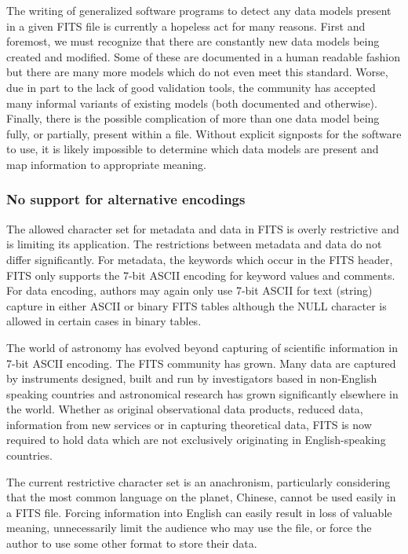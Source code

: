 \documentclass[final,authoryear,5p,times,twocolumn]{elsarticle}
\begin{document}
{{The writing of generalized software programs to detect any data models
present in a given FITS file is currently a hopeless act for many reasons.
First and foremost, we must recognize that there are constantly new data models
being created and modified. Some of these are documented in a human readable
fashion but there are many more models which do not even meet this standard.
Worse, due in part to the lack of good validation tools, the community has
accepted many informal variants of existing models (both documented and otherwise).
Finally, there is the possible complication of more than one data model being
fully, or partially, present within a file. Without explicit signposts for
the software to use, it is likely impossible to determine which data models
are present and map information to appropriate meaning.


\subsubsection{No support for alternative encodings}


The allowed character set for metadata and data in FITS is overly
restrictive and is limiting its application. The restrictions between
metadata and data do not differ significantly. For metadata, the
keywords which occur in the FITS header, FITS only supports the 7-bit
ASCII encoding for keyword values and comments. For data encoding,
authors may again only use 7-bit ASCII for text (string) capture in
either ASCII or binary FITS tables although the NULL character is
allowed in certain cases in binary tables.


The world of astronomy has evolved beyond capturing of scientific
information in 7-bit ASCII encoding. The FITS community has grown.
Many data are captured by instruments designed, built and run by
investigators based in non-English speaking countries and astronomical
research has grown significantly elsewhere in the world. Whether as
original observational data products, reduced data, information from new
services or in capturing theoretical data, FITS is now required to hold
data which are not exclusively originating in English-speaking countries.


The current restrictive character set is an
anachronism, particularly considering that the most common language on the planet,
Chinese, cannot be used easily in a FITS file. Forcing information
into English can easily result in loss of valuable meaning, unnecessarily
limit the audience who may use the file, or force the author to use some other
format to store their data.


}}
\end{document}

